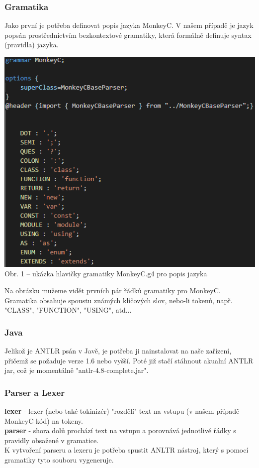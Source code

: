 \documentclass[czech,master,dept460,male,cpp,cpdeclaration]{diploma}
\begin{document}
\subsubsection{Gramatika}
Jako první je potřeba definovat popis jazyka MonkeyC. V našem případě je jazyk popsán prostřednictvím bezkontextové gramatiky, která formálně definuje syntax (pravidla) jazyka.

\begin{center}
	\includegraphics[scale=0.8]{grammar}
	\\
	Obr. 1 – ukázka hlavičky gramatiky MonkeyC.g4 pro popis jazyka
\end{center}

Na obrázku mužeme vidět prvních pár řádků gramatiky pro MonkeyC. Gramatika obsahuje spoustu známých klíčových slov, nebo-li tokenů, např. "CLASS", "FUNCTION", "USING", atd...

\subsubsection{Java}
Jelikož je ANTLR psán v Javě, je potřeba ji nainstalovat na naše zařízení, přičemž se požaduje verze 1.6 nebo vyšší. Poté již stačí stáhnout akualní ANTLR jar, což je momentálně "antlr-4.8-complete.jar".

\subsubsection{Parser a Lexer}
\textbf{lexer} - lexer (nebo také tokinizér) "rozdělí" text na vstupu (v našem případě MonkeyC kód) na tokeny.\\
\textbf{parser} - shora dolů prochází text na vstupu a porovnává jednotlivé řádky s pravidly obsažené v gramatice.\\
K vytvoření parseru a lexeru je potřeba spustit ANLTR nástroj, který s pomocí gramatiky tyto souboru vygeneruje.\\
\end{document}
